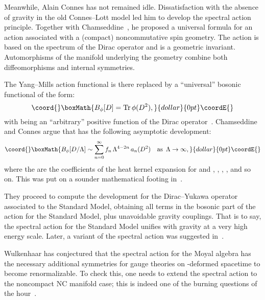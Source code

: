 \documentclass[a4paper,12pt]{article}
\providecommand{\as}{\quad\text{as}\enspace} %
\providecommand{\La}{\Lambda}           %
\DeclareMathOperator{\Tr}{Tr}       %
\providecommand{\1}{\mathbf{1}}         %
\providecommand{\7}{\dagger}            %
\providecommand{\8}{\bullet}            %
\renewcommand{\.}{\cdot}            %
\renewcommand{\:}{\colon}           %
\begin{document}
Meanwhile, Alain Connes has not remained idle. Dissatisfaction with
the absence of gravity in the old Connes--Lott model led him to
develop the spectral action principle. Together with
Chamseddine~\cite{ChamseddineCSpec}, he proposed a universal formula
for an action associated with a (compact) noncommutative spin geometry. The
action is based on the spectrum of the Dirac operator and is a
geometric invariant. Automorphisms of the manifold underlying the
geometry combine both diffeomorphisms and internal symmetries.

The Yang--Mills action functional is there replaced by a ``universal''
bosonic functional of the form:
$$\coord{}\boxMath{
B_\phi[D] = \Tr \phi(D^2),
}{dollar}{0pt}\coordE{}$$
with \myHighlight{$\phi$}\coordHE{} being an ``arbitrary'' positive function of the Dirac
operator~\coordHE{}. Chamseddine and Connes argue that \coordHE{} has the
following asymptotic development:
$$\coord{}\boxMath{
B_\phi[D/\La] \sim \sum_{n=0}^\infty f_n\, \La^{4-2n}\, a_n(D^2)
\as \La \to \infty,
}{dollar}{0pt}\coordE{}$$
where the \coordHE{} are the coefficients of the heat kernel expansion for
\coordHE{} and \coordHE{},
\coordHE{}, \coordHE{},
\coordHE{}, and so on. This was put on a sounder mathematical
footing in~\cite{Odysseus}.

They proceed to compute the development for the Dirac--Yukawa operator
associated to the Standard Model, obtaining all terms in the bosonic
part of the action for the Standard Model, plus unavoidable gravity
couplings. That is to say, the spectral action for the Standard Model
unifies with gravity at a very high energy scale. Later, a variant of
the spectral action was suggested in~\cite{Zappafrank}.

Wulkenhaar has conjectured that the spectral action for the
Moyal algebra has the necessary additional symmetries for gauge
theories on \myHighlight{$\theta$}\coordHE{}-deformed spacetime to become renormalizable. To
check this, one needs to extend the spectral action to the noncompact
NC manifold case; this is indeed one of the burning questions of
the hour~\cite{Selene}.

\medskip
\end{document}
